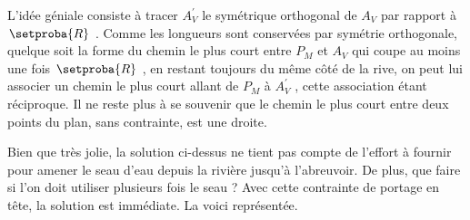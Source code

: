 \smallskip
\begin{center}
\end{center}


\medskip


L'idée géniale consiste à tracer $A_V^\prime$ le symétrique orthogonal de $A_V$ par rapport à $\setproba{R}$ . Comme les longueurs sont conservées par symétrie orthogonale, quelque soit la forme du chemin le plus court entre $P_M$ et $A_V$ qui coupe au moins une fois $\setproba{R}$ , en restant toujours du même côté de la rive, on peut lui associer un chemin le plus court allant de $P_M$ à $A_V^\prime$ , cette association étant réciproque. Il ne reste plus à se souvenir que le chemin le plus court entre deux points du plan, sans contrainte, est une droite.


\medskip


Bien que très jolie, la solution ci-dessus ne tient pas compte de l'effort à fournir pour amener le seau d'eau depuis la rivière jusqu'à l'abreuvoir. De plus, que faire si l'on doit utiliser plusieurs fois le seau ? Avec cette contrainte de portage en tête, la solution est immédiate. La voici représentée.

\smallskip
\begin{center}
\end{center}